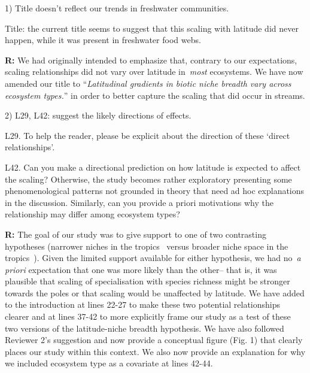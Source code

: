 \documentclass[12pt]{letter}
\newenvironment{refquote}{\bigskip \begin{it}}{\end{it}\smallskip}
\newcommand{\mytitle}{\emph{Latitudinal gradients in biotic niche breadth vary across ecosystem types.}}
\begin{document}
  1) Title doesn't reflect our trends in freshwater communities.

  \begin{refquote}

    Title: the current title seems to suggest that this scaling with latitude
    did never happen, while it was present in freshwater food webs.

  \end{refquote}


  \textbf{R:} We had originally intended to emphasize that, contrary to our expectations,
  scaling relationships did not vary over latitude in~\emph{most} ecosystems. We have now amended our
  title to ``\mytitle'' in order to better capture the scaling that did occur in streams.


  2) L29, L42: suggest the likely directions of effects.

  \begin{refquote}

    L29. To help the reader, please be explicit about the direction of these ‘direct relationships’.

    \smallskip

    L42. Can you make a directional prediction on how latitude is expected to
    affect the scaling? Otherwise, the study becomes rather exploratory
    presenting some phenomenological patterns not grounded in theory that need
    ad hoc explanations in the discussion. Similarly, can you provide a priori
    motivations why the relationship may differ among ecosystem types?

  \end{refquote}


  \textbf{R:} The goal of our study was to give support to
  one of two contrasting hypotheses (narrower niches in the
  tropics~\cite{Vazquez2004} versus broader niche space in 
  the tropics~\cite{Davies2007}). Given the limited support
  available for either hypothesis, we had no~\emph{a priori}
  expectation that one was more likely than the other-- that
  is, it was plausible that scaling of specialisation with
  species richness might be stronger towards the poles or 
  that scaling would be unaffected by latitude. We have 
  added to the introduction at lines 22-27 to make these two
  potential relationships clearer and at lines 37-42 to more
  explicitly frame our study as a test of these two versions 
  of the latitude-niche breadth hypothesis. We have also 
  followed Reviewer 2's suggestion and now provide a 
  conceptual figure (Fig. 1) that clearly places our study
  within this context. We also now provide an explanation 
  for why we included ecosystem type as a covariate at lines
  42-44.
 
\end{document}
